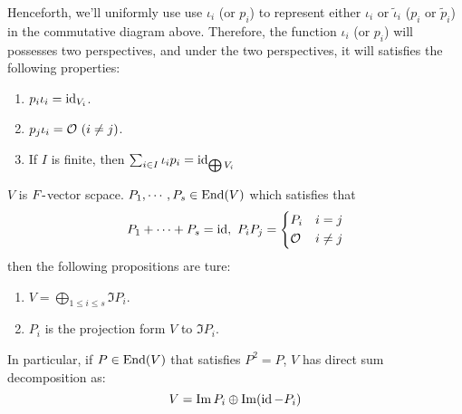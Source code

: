 \begin{center}
\end{center}



Henceforth, we'll uniformly use use $\iota_i$ (or $p_i$) to represent either $\iota_i$ or $\tilde{\iota}_i$ ($p_i$ or $\tilde{p}_i$) in the commutative diagram above. Therefore, the function $\iota_i$ (or $p_i$) will possesses two perspectives, and under the two perspectives, it will satisfies the following properties:

\begin{corollary}
    \hfill

    \begin{enumerate}
        \item $p_i \iota_i = \operatorname{id}_{V_i}$.
        \item $p_j \iota_i = {\cal O} \ (i \neq j)$.
        \item If $I $ is finite, then $\sum_{i \in I} \iota_i p_i = \operatorname{id}_{\bigoplus V_i}$
    \end{enumerate}
\end{corollary}


\begin{corollary}
    $V$ is $F\mbox{-}$vector scpace. $P_1, \cdots, P_s \in \operatorname{End}(V)$ which satisfies that 
    \[
        P_1 + \cdots + P_s = \idd,\ P_i P_j = \left\{
        \begin{aligned}
            & P_i & i=j \\
            & \calO & i \neq j
        \end{aligned}
        \right.
    \]
    then the following propositions are ture:
    \begin{enumerate}
        \item $V = \bigoplus_{1 \leq i \leq s} \Im P_i$.
        \item $P_i$ is the projection form $V$ to $\Im P_i$.
    \end{enumerate}
    In particular, if $P \in \operatorname{End}(V)$ that satisfies $P^2 = P$, $V$ has direct sum decomposition as:
    \[
        V = \operatorname{Im} P_i \oplus \operatorname{Im} (\operatorname{id} - P_i)
    \]
\end{corollary}




